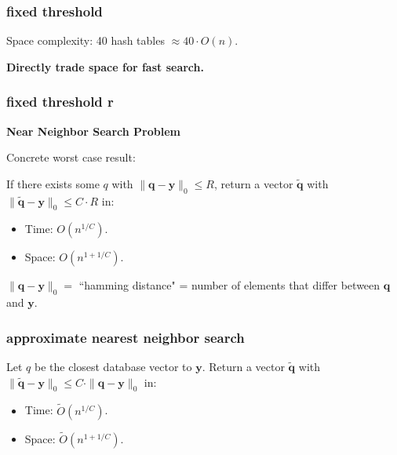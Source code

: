 \documentclass[compress]{beamer}
\newcommand{\bv}[1]{\mathbf{#1}}
\begin{document}
\begin{frame}
	\frametitle{fixed threshold}
	\begin{center}
	Space complexity: 40 hash tables \alert{$\approx 40\cdot O(n)$}. 
	
	\textbf{Directly trade space for fast search.}
	\end{center}
\end{frame}

\begin{frame}
	\frametitle{fixed threshold r}
	\begin{center}
	\textbf{Near Neighbor Search Problem}
\end{center}

	Concrete worst case result:
	\begin{theorem}
		If there exists some $q$ with $\|\bv{q} - \bv{y}\|_0 \leq R$, return a vector $\tilde{\bv{q}}$ with $\|\tilde{\bv{q}} - \bv{y}\|_0 \leq C\cdot R$ in:
		\begin{itemize}
			\item Time: $O\left(n^{1/C}\right)$.
			\item Space: $O\left(n^{1 + 1/C}\right)$. 
		\end{itemize}
	\end{theorem}
	$\|\bv{q} - \bv{y}\|_0 = $ ``hamming distance" = number of elements that differ between $\bv{q}$ and $\bv{y}$. 
\end{frame}

\begin{frame}
	\frametitle{approximate nearest neighbor search}
		\begin{theorem}
		Let $q$ be the closest database vector to $\bv{y}$. Return a vector $\tilde{\bv{q}}$ with $\|\tilde{\bv{q}} - \bv{y}\|_0 \leq C\cdot \|{\bv{q}} - \bv{y}\|_0$ in:
		\begin{itemize}
			\item Time: $\tilde{O}\left(n^{1/C}\right)$.
			\item Space: $\tilde{O}\left(n^{1 + 1/C}\right)$. 
		\end{itemize}
	\end{theorem}
\end{frame}
\end{document}
